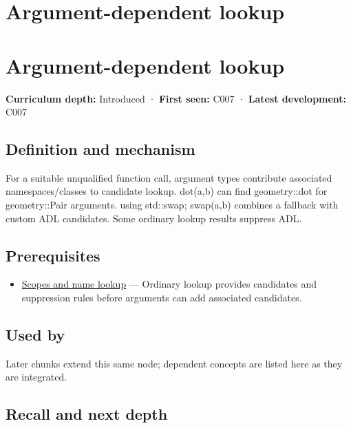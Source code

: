 \hypertarget{appendix-7863714aa97f}{}
\section*{Argument-dependent lookup}
\section{Argument-dependent lookup}\label{appendix-7863714aa97f-argument-dependent-lookup}

\textbf{Curriculum depth:} Introduced · \textbf{First seen:} C007 · \textbf{Latest development:} C007

\subsection{Definition and mechanism}\label{appendix-7863714aa97f-definition-and-mechanism}

For a suitable unqualified function call, argument types contribute associated namespaces/classes to candidate lookup. dot(a,b) can find geometry::dot for geometry::Pair arguments. using std::swap; swap(a,b) combines a fallback with custom ADL candidates. Some ordinary lookup results suppress ADL.

\subsection{Prerequisites}\label{appendix-7863714aa97f-prerequisites}

\begin{itemize}
\tightlist
\item
  \hyperref[appendix-b12b31759da1]{Scopes and name lookup} --- Ordinary lookup provides candidates and suppression rules before arguments can add associated candidates.
\end{itemize}

\subsection{Used by}\label{appendix-7863714aa97f-used-by}

Later chunks extend this same node; dependent concepts are listed here as they are integrated.

\subsection{Recall and next depth}\label{appendix-7863714aa97f-recall-and-next-depth}


